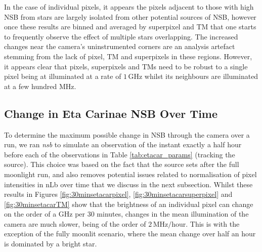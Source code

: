 In the case of individual pixels, it appears the pixels adjacent to those with high NSB from stars are largely isolated from other potential sources of NSB, however once these results are binned and averaged by superpixel and TM that one starts to frequently observe the effect of multiple stars overlapping. The increased changes near the camera's uninstrumented corners are an analysis artefact stemming from the lack of pixel, TM and superpixels in these regions. However, it appears clear that pixels, superpixels and TMs need to be robust to a single pixel being at illuminated at a rate of $\mathrm{1\,GHz}$ whilst its neighbours are illuminated at a few hundred MHz.

\subsection{Change in Eta Carinae NSB Over Time}
To determine the maximum possible change in NSB through the camera over a run, we ran \textit{nsb} to simulate an observation of the instant exactly a half hour before each of the observations in Table \ref{tab:etacar_params} (tracking the source). This choice was based on the fact that the source sets after the full moonlight run, and also removes potential issues related to normalisation of pixel intensities in nLb over time that we discuss in the next subsection. Whilst these results in Figures \ref{fig:30minsetacarpixel}, \ref{fig:30minsetacarsuperpixel} and \ref{fig:30minsetacarTM} show that the brightness of an individual pixel can change on the order of a GHz per 30 minutes, changes in the mean illumination of the camera are much slower, being of the order of $\mathrm{2\,MHz/hour}$. This is with the exception of the fully moonlit scenario, where the mean change over half an hour is dominated by a bright star.

